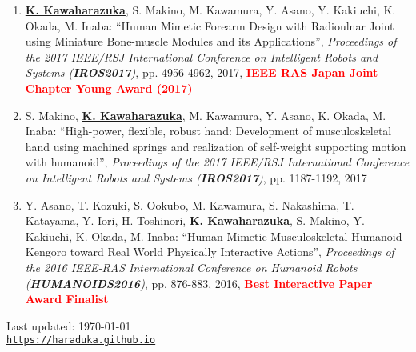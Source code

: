 \documentclass[letterpaper]{article}
\def\footerlink{https://haraduka.github.io}
\begin{document}
\begin{enumerate}
\item \underline{\textbf{K. Kawaharazuka}}, S. Makino, M. Kawamura, Y. Asano, Y. Kakiuchi, K. Okada, M. Inaba: ``Human Mimetic Forearm Design with Radioulnar Joint using Miniature Bone-muscle Modules and its Applications'', \textit{Proceedings of the 2017 IEEE/RSJ International Conference on Intelligent Robots and Systems (\textit{\textbf{IROS2017}})}, pp. 4956-4962, 2017, \textbf{\textcolor{red}{IEEE RAS Japan Joint Chapter Young Award (2017)}}
\item S. Makino, \underline{\textbf{K. Kawaharazuka}}, M. Kawamura, Y. Asano, K. Okada, M. Inaba: ``High-power, flexible, robust hand: Development of musculoskeletal hand using machined springs and realization of self-weight supporting motion with humanoid'', \textit{Proceedings of the 2017 IEEE/RSJ International Conference on Intelligent Robots and Systems (\textit{\textbf{IROS2017}})}, pp. 1187-1192, 2017
\item Y. Asano, T. Kozuki, S. Ookubo, M. Kawamura, S. Nakashima, T. Katayama, Y. Iori, H. Toshinori, \underline{\textbf{K. Kawaharazuka}}, S. Makino, Y. Kakiuchi, K. Okada, M. Inaba: ``Human Mimetic Musculoskeletal Humanoid Kengoro toward Real World Physically Interactive Actions'', \textit{Proceedings of the 2016 IEEE-RAS International Conference on Humanoid Robots (\textit{\textbf{HUMANOIDS2016}})}, pp. 876-883, 2016, \textbf{\textcolor{red}{Best Interactive Paper Award Finalist}}
\end{enumerate}


\bigskip

\begin{center}
  \begin{footnotesize}
    Last updated: \today \\
    \href{\footerlink}{\texttt{\footerlink}}
  \end{footnotesize}
\end{center}
\end{document}
